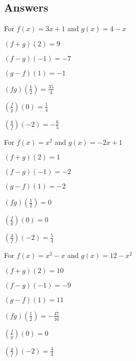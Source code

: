 \clearpage

\subsection{Answers}

\startexenum

\begin{exenum}

\item For  $f(x) = 3x+1$ and $g(x) = 4-x$

\begin{shortitemize}[MMMMMMMMMM]
\item  $(f+g)(2) = 9$
\item  $(f-g)(-1) = -7$
\item  $(g-f)(1) = -1$
\item  $(fg)\left(\frac{1}{2}\right) = \frac{35}{4}$
\item  $\left(\frac{f}{g}\right)(0) = \frac{1}{4}$
\item  $\left(\frac{g}{f}\right)\left(-2\right) = -\frac{6}{5}$
\end{shortitemize}

\item For  $f(x) = x^2$ and $g(x) = -2x+1$

\begin{shortitemize}[MMMMMMMMMM]
\item  $(f+g)(2) = 1$
\item  $(f-g)(-1) = -2$
\item  $(g-f)(1) = -2$
\item  $(fg)\left(\frac{1}{2}\right) = 0$
\item  $\left(\frac{f}{g}\right)(0) = 0$
\item  $\left(\frac{g}{f}\right)\left(-2\right) = \frac{5}{4}$
\end{shortitemize}

\item For  $f(x) = x^2 - x$ and  $g(x) = 12-x^2$

\begin{shortitemize}[MMMMMMMMMM]
\item  $(f+g)(2) = 10$
\item  $(f-g)(-1) = -9$
\item  $(g-f)(1) = 11$
\item  $(fg)\left(\frac{1}{2}\right) = -\frac{47}{16}$
\item  $\left(\frac{f}{g}\right)(0) = 0$
\item  $\left(\frac{g}{f}\right)\left(-2\right) = \frac{4}{3}$
\end{shortitemize}


\end{exenum}

